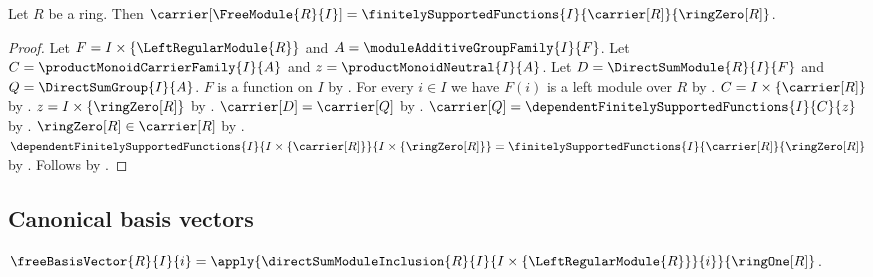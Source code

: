 \begin{theorem}\label{free_module_carrier}
    Let $R$ be a ring.
    Then
        $\carrier[\FreeModule{R}{I}]
            =\finitelySupportedFunctions
                {I}{\carrier[R]}{\ringZero[R]}$.
\end{theorem}
\begin{proof}
    Let $F=I\times\{\LeftRegularModule{R}\}$ and
        $A=\moduleAdditiveGroupFamily{I}{F}$.
    Let $C=\productMonoidCarrierFamily{I}{A}$ and
        $z=\productMonoidNeutral{I}{A}$.
    Let $D=\DirectSumModule{R}{I}{F}$ and
        $Q=\DirectSumGroup{I}{A}$.
    $F$ is a function on $I$ by
        .
    For every $i\in I$ we have $F(i)$ is a left module over $R$ by
        .
    $C=I\times\{\carrier[R]\}$ by
        .
    $z=I\times\{\ringZero[R]\}$ by
        .
    $\carrier[D]=\carrier[Q]$ by
        .
    $\carrier[Q]
        =\dependentFinitelySupportedFunctions{I}{C}{z}$ by
        .
    $\ringZero[R]\in\carrier[R]$ by .
    $\dependentFinitelySupportedFunctions
        {I}{I\times\{\carrier[R]\}}{I\times\{\ringZero[R]\}}
        =\finitelySupportedFunctions
            {I}{\carrier[R]}{\ringZero[R]}$ by
        .
    Follows by .
\end{proof}

\subsection{Canonical basis vectors}

\begin{definition}\label{free_basis_vector}
    $\freeBasisVector{R}{I}{i}
        =\apply{\directSumModuleInclusion
            {R}{I}{I\times\{\LeftRegularModule{R}\}}{i}}{
                \ringOne[R]}$.
\end{definition}

